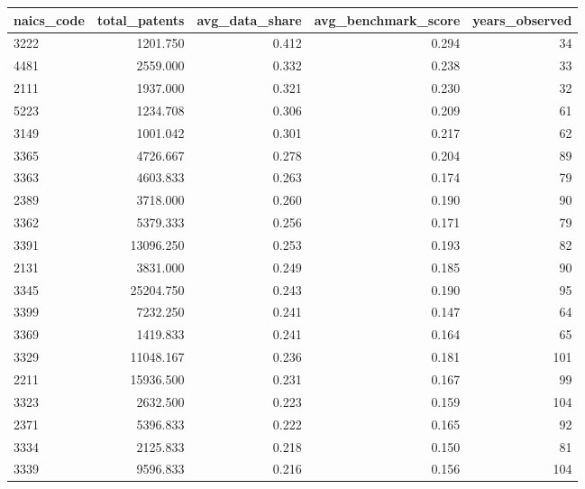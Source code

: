 \begin{tabular}{lrrrr}
\toprule
naics_code & total_patents & avg_data_share & avg_benchmark_score & years_observed \\
\midrule
3222 & 1201.750 & 0.412 & 0.294 & 34 \\
4481 & 2559.000 & 0.332 & 0.238 & 33 \\
2111 & 1937.000 & 0.321 & 0.230 & 32 \\
5223 & 1234.708 & 0.306 & 0.209 & 61 \\
3149 & 1001.042 & 0.301 & 0.217 & 62 \\
3365 & 4726.667 & 0.278 & 0.204 & 89 \\
3363 & 4603.833 & 0.263 & 0.174 & 79 \\
2389 & 3718.000 & 0.260 & 0.190 & 90 \\
3362 & 5379.333 & 0.256 & 0.171 & 79 \\
3391 & 13096.250 & 0.253 & 0.193 & 82 \\
2131 & 3831.000 & 0.249 & 0.185 & 90 \\
3345 & 25204.750 & 0.243 & 0.190 & 95 \\
3399 & 7232.250 & 0.241 & 0.147 & 64 \\
3369 & 1419.833 & 0.241 & 0.164 & 65 \\
3329 & 11048.167 & 0.236 & 0.181 & 101 \\
2211 & 15936.500 & 0.231 & 0.167 & 99 \\
3323 & 2632.500 & 0.223 & 0.159 & 104 \\
2371 & 5396.833 & 0.222 & 0.165 & 92 \\
3334 & 2125.833 & 0.218 & 0.150 & 81 \\
3339 & 9596.833 & 0.216 & 0.156 & 104 \\
\bottomrule
\end{tabular}
